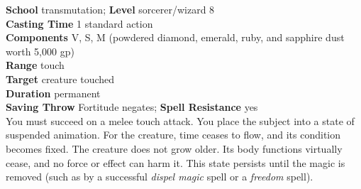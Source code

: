 \textbf{School} transmutation; \textbf{Level} sorcerer/wizard 8\\
\textbf{Casting Time} 1 standard action\\
\textbf{Components} V, S, M (powdered diamond, emerald, ruby, and sapphire dust worth 5,000 gp)\\
\textbf{Range} touch\\
\textbf{Target} creature touched\\
\textbf{Duration} permanent\\
\textbf{Saving Throw} Fortitude negates; \textbf{Spell Resistance} yes\\
You must succeed on a melee touch attack. You place the subject into a state of suspended animation. For the creature, time ceases to flow, and its condition becomes fixed. The creature does not grow older. Its body functions virtually cease, and no force or effect can harm it. This state persists until the magic is removed (such as by a successful \textit{dispel magic }spell or a \textit{freedom }spell).\\
